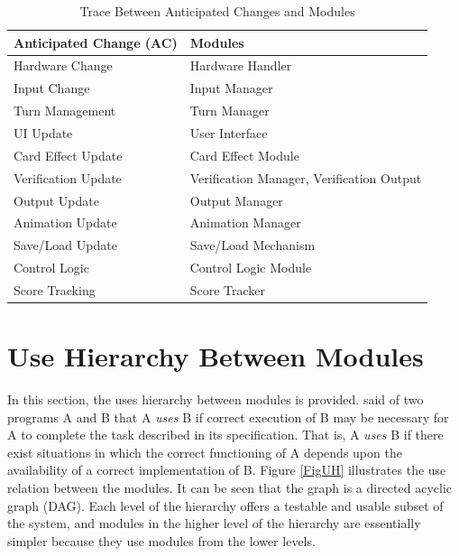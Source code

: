 \documentclass[12pt, titlepage]{article}
\begin{document}
\begin{table}[H]
\centering
\begin{tabular}{p{} p{}}
\toprule
\textbf{Anticipated Change (AC)} & \textbf{Modules}\\
\midrule
Hardware Change & Hardware Handler\\
Input Change & Input Manager\\
Turn Management & Turn Manager\\
UI Update & User Interface\\
Card Effect Update & Card Effect Module\\
Verification Update & Verification Manager, Verification Output\\
Output Update & Output Manager\\
Animation Update & Animation Manager\\
Save/Load Update & Save/Load Mechanism\\
Control Logic & Control Logic Module\\
Score Tracking & Score Tracker\\
\bottomrule
\end{tabular}
\caption{Trace Between Anticipated Changes and Modules}
\label{TblACT}
\end{table}




\section{Use Hierarchy Between Modules} \label{SecUse}

In this section, the uses hierarchy between modules is
provided. \citet{Parnas1978} said of two programs A and B that A {\em uses} B if
correct execution of B may be necessary for A to complete the task described in
its specification. That is, A {\em uses} B if there exist situations in which
the correct functioning of A depends upon the availability of a correct
implementation of B.  Figure \ref{FigUH} illustrates the use relation between
the modules. It can be seen that the graph is a directed acyclic graph
(DAG). Each level of the hierarchy offers a testable and usable subset of the
system, and modules in the higher level of the hierarchy are essentially simpler
because they use modules from the lower levels.

\end{document}
